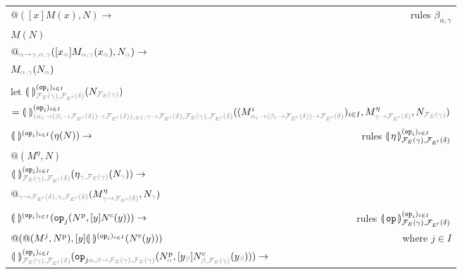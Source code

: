\begin{sidewaysfigure}
  \centering
  \begin{tabular}{lr}
  $@([x]M(x), N) \to$ & rules $\beta_{\alpha,\gamma}$ \\
  $M (N)$ & \\
  \multicolumn{2}{l}{$@_{\typehint{\alpha \to \gamma, \alpha, \gamma}}([x_{\typehint\alpha}]M_{\typehint{\alpha, \gamma}}(x_{\typehint\alpha}), N_{\typehint\alpha}) \to$} \\
  \multicolumn{2}{l}{$M_{\typehint{\alpha, \gamma}}(N_{\typehint\alpha})$} \\
  \\
  let $\banana{}^{(\op{op}_i)_{i \in
    I}}_{\typehint{\FF_E(\gamma),\FF_{E'}(\delta)}}(N_{\typehint{\FF_E(\gamma)}})$ & \\
  \multicolumn{2}{l}{$ = \banana{}^{(\op{op}_i)_{i \in I}}_{\typehint{(\alpha_i \to (\beta_i \to \FF_{E'}(\delta)) \to
  \FF_{E'}(\delta))_{i \in I}, \gamma \to \FF_{E'}(\delta), \FF_E(\gamma),
  \FF_{E'}(\delta)}} ((M^i_{\typehint{\alpha_i \to (\beta_i \to
    \FF_{E'}(\delta)) \to \FF_{E'}(\delta)}})_{i \in I},
    M^\eta_{\typehint{\gamma \to \FF_{E'}(\delta)}}, N_{\typehint{\FF_E(\gamma)}})$} \\
  \\
  $\llparenthesis \,  \, \rrparenthesis^{(\mathtt{op}_i)_{i \in I}} (\eta (N)) \to$ & rules $\llparenthesis \, \eta \, \rrparenthesis^{(\mathtt{op}_i)_{i \in I}}_{\mathcal{F}_E(\gamma),\mathcal{F}_{E'}(\delta)}$ \\
  $@(M^\eta, N)$ & \\
  \multicolumn{2}{l}{$\banana{}^{(\op{op}_i)_{i \in I}}_{\typehint{\FF_E(\gamma), \FF_{E'}(\delta)}} (\eta_{\typehint{\gamma, \FF_E(\gamma)}} (N_{\typehint{\gamma}})) \to$} \\
  \multicolumn{2}{l}{$@_{\typehint{\gamma \to \FF_{E'}(\delta), \gamma,
  \FF_{E'}(\delta)}} (M^\eta_{\typehint{\gamma \to \FF_{E'}(\delta)}}, N_{\typehint{\gamma}})$} \\
  \\
  $\llparenthesis \,  \, \rrparenthesis^{(\mathtt{op}_i)_{i \in I}} (\mathtt{op}_j (N^{\mathrm{p}}, [y] N^{\mathrm{c}}(y))) \to$ & rules $\llparenthesis \, \mathtt{op} \, \rrparenthesis^{(\mathtt{op}_i)_{i \in I}}_{\mathcal{F}_E(\gamma),\mathcal{F}_{E'}(\delta)}$ \\
  $@(@(M^j, N^{\mathrm{p}}), [y] \llparenthesis \,  \, \rrparenthesis^{(\mathtt{op}_i)_{i \in I}} (N^{\mathrm{c}}(y)))$ & where $j \in I$ \\
  \multicolumn{2}{l}{$\banana{}^{(\op{op}_i)_{i \in I}}_{\typehint{\FF_E(\gamma), \FF_{E'}(\delta)}} (\op{op}_{j \typehint{\alpha, \beta \to \FF_E(\gamma), \FF_E(\gamma)}} (N^{\mathrm{p}}_{\typehint{\alpha}}, [y_{\typehint{\beta}}] N^{\mathrm{c}}_{\typehint{\beta, \FF_E(\gamma)}}(y_{\typehint{\beta}}))) \to$} \\

\end{tabular}
\end{sidewaysfigure}
